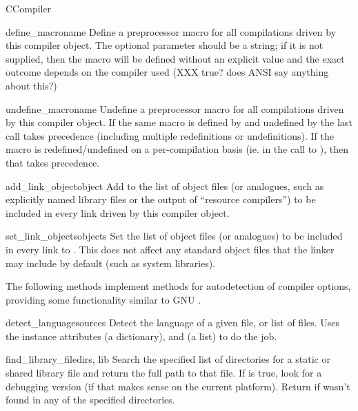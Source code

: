 \documentclass{manual}
\begin{document}
\begin{classdesc}{CCompiler}{}
\begin{methoddesc}{define_macro}{name}
Define a preprocessor macro for all compilations driven by this
compiler object.  The optional parameter  should be a
string; if it is not supplied, then the macro will be defined
without an explicit value and the exact outcome depends on the
compiler used (XXX true? does ANSI say anything about this?)
\end{methoddesc}

\begin{methoddesc}{undefine_macro}{name}
Undefine a preprocessor macro for all compilations driven by
this compiler object.  If the same macro is defined by
 and undefined by  
the last call takes precedence (including multiple redefinitions or
undefinitions).  If the macro is redefined/undefined on a
per-compilation basis (ie. in the call to ), then that
takes precedence.
\end{methoddesc}

\begin{methoddesc}{add_link_object}{object}
Add  to the list of object files (or analogues, such as
explicitly named library files or the output of ``resource
compilers'') to be included in every link driven by this compiler
object.
\end{methoddesc}

\begin{methoddesc}{set_link_objects}{objects}
Set the list of object files (or analogues) to be included in
every link to .  This does not affect any standard object
files that the linker may include by default (such as system
libraries).
\end{methoddesc}

The following methods implement methods for autodetection of compiler 
options, providing some functionality similar to GNU .

\begin{methoddesc}{detect_language}{sources}
Detect the language of a given file, or list of files. Uses the 
instance attributes  (a dictionary), and 
 (a list) to do the job.
\end{methoddesc}

\begin{methoddesc}{find_library_file}{dirs, lib}
Search the specified list of directories for a static or shared
library file  and return the full path to that file.  If
 is true, look for a debugging version (if that makes sense on
the current platform).  Return  if  wasn't found in any of
the specified directories.
\end{methoddesc}


\end{classdesc}
\end{document}
